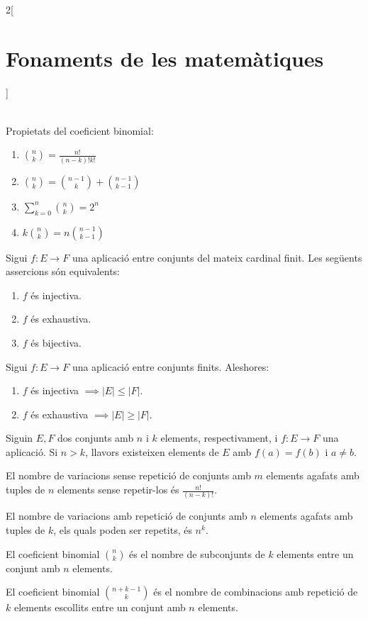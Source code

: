 \documentclass[../../../main.tex]{subfiles}
\begin{document}
\begin{multicols}{2}[\section{Fonaments de les matemàtiques}]
\begin{definition}
\begin{align*}
\end{align*}
\end{definition}
\begin{prop}
Propietats del coeficient binomial:
\begin{enumerate}
    \item $\binom{n}{k}=\frac{n!}{(n-k)!k!}$
    \item $\binom{n}{k}=\binom{n-1}{k}+\binom{n-1}{k-1}$
    \item $\sum_{k=0}^n\binom{n}{k}=2^n$
    \item $k\binom{n}{k}=n\binom{n-1}{k-1}$
\end{enumerate}
\end{prop}
\begin{prop}
Sigui $f:E\rightarrow F$ una aplicació entre conjunts del mateix cardinal finit. Les següents assercions són equivalents:
\begin{enumerate}
    \item $f$ és injectiva.
    \item $f$ és exhaustiva.
    \item $f$ és bijectiva.
\end{enumerate}
\end{prop}
\begin{corollary}
Sigui $f:E\rightarrow F$ una aplicació entre conjunts finits. Aleshores:
\begin{enumerate}
    \item $f$ és injectiva $\implies|E|\leq|F|$.
    \item $f$ és exhaustiva $\implies|E|\geq|F|$.
\end{enumerate}
\end{corollary}
\begin{theorem}
Siguin $E,F$ dos conjunts amb $n$ i $k$ elements, res\-pec\-ti\-va\-ment, i $f:E\rightarrow F$ una aplicació. Si $n>k$, llavors existeixen elements de $E$ amb $f(a)=f(b)$ i $a\ne b$.
\end{theorem}
\begin{prop}
El nombre de variacions sense repetició de conjunts amb $m$ elements agafats amb tuples de $n$ elements sense repetir-los és $\frac{n!}{(n-k)!}$.
\end{prop}
\begin{prop}
El nombre de variacions amb repetició de conjunts amb $n$ elements agafats amb tuples de $k$, els quals poden ser repetits, és $n^k$.
\end{prop}
\begin{prop}
El coeficient binomial $\binom{n}{k}$ és el nombre de subconjunts de $k$ elements entre un conjunt amb $n$ elements.
\end{prop}
\begin{prop}
El coeficient binomial $\binom{n+k-1}{k}$ és el nombre de combinacions amb repetició de $k$ elements escollits entre un conjunt amb $n$ elements.
\end{prop}

\end{multicols}
\end{document}
